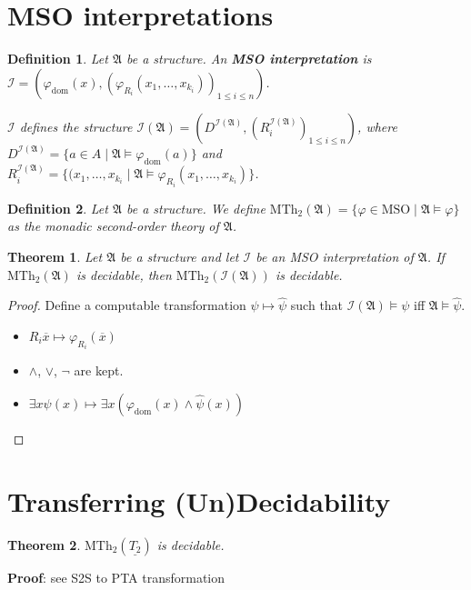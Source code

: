 \documentclass{article}
\newtheorem{theorem}{Theorem}
\newtheorem{definition}{Definition}
\begin{document}
\section{MSO interpretations}
\begin{definition}
	Let $\mathfrak{A}$ be a structure. An \textbf{MSO interpretation} is $\mathcal{I} = (\varphi_\text{dom}(x), (\varphi_{R_i}(x_1, \dots, x_{k_i}))_{1 \leq i \leq n})$. 

	$\mathcal{I}$ defines the structure $\mathcal{I}(\mathfrak{A}) = ( D^{\mathcal{I}(\mathfrak{A})}, (R_i^{\mathcal{I}(\mathfrak{A})})_{1 \leq i \leq n})$, where $D^{\mathcal{I}(\mathfrak{A})} = \{ a \in A \mid \mathfrak{A} \models \varphi_\text{dom}(a) \}$ and $R_i^{\mathcal{I}(\mathfrak{A})} = \{(x_1, \dots, x_{k_i} \mid \mathfrak{A} \models \varphi_{R_i}(x_1, \dots, x_{k_i})\}$.
\end{definition}

\begin{definition}
	Let $\mathfrak{A}$ be a structure. We define $\text{MTh}_2(\mathfrak{A}) = \{ \varphi \in \text{MSO} \mid \mathfrak{A} \models \varphi \}$ as the monadic second-order theory of $\mathfrak{A}$.
\end{definition}

\begin{theorem}
\label{thm:transf_dec}
	Let $\mathfrak{A}$ be a structure and let $\mathcal{I}$ be an MSO interpretation of $\mathfrak{A}$. If $\text{MTh}_2(\mathfrak{A})$ is decidable, then $\text{MTh}_2(\mathcal{I}(\mathfrak{A}))$ is decidable.
\end{theorem}
\begin{proof}
	Define a computable transformation $\psi \mapsto \hat{\psi}$ such that $\mathcal{I}(\mathfrak{A}) \models \psi$ iff $\mathfrak{A} \models \hat{\psi}$.
	
	\begin{itemize}
		\item $R_i \overline{x} \mapsto \varphi_{R_i}(\overline{x})$
		\item $\land$, $\lor$, $\neg$ are kept.
		\item $\exists x \psi(x) \mapsto \exists x (\varphi_\text{dom}(x) \land \hat{\psi}(x))$
	\end{itemize}
\end{proof}

\section{Transferring (Un)Decidability}
\begin{theorem}
	$\text{MTh}_2(\underline{T_2})$ is decidable.
\end{theorem}
\textbf{Proof}: see S2S to PTA transformation
\end{document}
